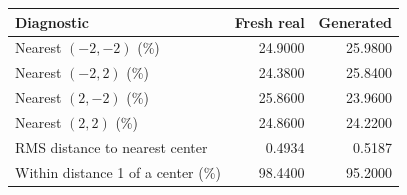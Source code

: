\begin{tabular}{lrr}
\toprule
Diagnostic & Fresh real & Generated\\
\midrule
Nearest $(-2,-2)$ (\%) & 24.9000 & 25.9800\\[1mm]
Nearest $(-2,2)$ (\%) & 24.3800 & 25.8400\\[1mm]
Nearest $(2,-2)$ (\%) & 25.8600 & 23.9600\\[1mm]
Nearest $(2,2)$ (\%) & 24.8600 & 24.2200\\[1mm]
RMS distance to nearest center & 0.4934 & 0.5187\\[1mm]
Within distance 1 of a center (\%) & 98.4400 & 95.2000\\[1mm]
\bottomrule
\end{tabular}
